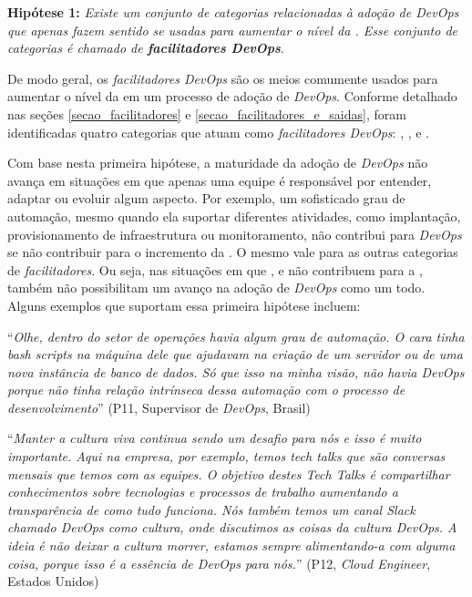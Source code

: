 \begin{mh}
{\bf Hipótese 1:} {\it Existe um conjunto de categorias relacionadas à adoção de
{\it DevOps} que apenas fazem sentido se usadas para aumentar o nível da \cc.
Esse conjunto de categorias é chamado de {\bf \emph{facilitadores DevOps}}}.
\end{mh}

De modo geral, os \emph{facilitadores DevOps} são os meios comumente usados para
aumentar o nível da \cc em um processo de adoção de {\it DevOps}. Conforme
detalhado nas seções \ref{secao_facilitadores} e \ref{secao_facilitadores_e_saidas},
foram identificadas quatro categorias que atuam como \emph{facilitadores DevOps}:
, ,  e
.

Com base nesta primeira hipótese, a maturidade da adoção de {\it DevOps} não
avança em situações em que apenas uma equipe é responsável por entender, adaptar ou
evoluir algum aspecto. Por exemplo, um sofisticado grau de automação, mesmo
quando ela suportar diferentes atividades, como implantação, provisionamento de
infraestrutura ou monitoramento, não contribui para \emph{DevOps} se não
contribuir para o incremento da \cc. O mesmo vale para as outras categorias
de \emph{facilitadores}. Ou seja, nas situações em que ,  e  não
contribuem para a \cc, também não possibilitam um avanço na adoção de
{\it DevOps} como um todo. Alguns exemplos que suportam essa primeira hipótese
incluem:

\begin{mq}
``\emph{Olhe, dentro do setor de operações havia algum grau de automação. O cara
 tinha bash scripts na máquina dele que ajudavam na criação de um servidor ou
 de uma nova instância de banco de dados. Só que isso na minha visão,
 não havia DevOps porque não tinha relação intrínseca dessa automação com o
 processo de desenvolvimento}'' (P11, Supervisor de {\it DevOps}, Brasil)
\end{mq}

\begin{mq}
``\emph{Manter a cultura viva continua sendo um desafio para nós e isso é muito
importante. Aqui na empresa, por exemplo, temos tech talks que são conversas
mensais que temos com as equipes. O objetivo destes Tech Talks é compartilhar
conhecimentos sobre tecnologias e processos de trabalho aumentando a
transparência de como tudo funciona. Nós também temos um canal Slack chamado
DevOps como cultura, onde discutimos as coisas da cultura DevOps. A ideia é
não deixar a cultura morrer, estamos sempre alimentando-a com alguma coisa,
porque isso é a essência de DevOps para nós.}'' (P12, {\it Cloud Engineer}, Estados Unidos)
\end{mq}

